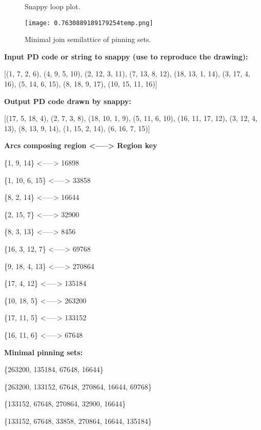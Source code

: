 \documentclass{article}%
\begin{document}
\begin{multicols}{2}
\begin{figure}[H]
\centering

\caption{Snappy loop plot.}
\label{fig:0.8232801002961481temp.svg}
\end{figure}\columnbreak

\begin{figure}[H]
\centering
\texttt{[image: 0.7630889189179254temp.png]}
\caption{Minimal join semilattice of pinning sets.}
\label{fig:0.7630889189179254temp.png}
\end{figure}\end{multicols}\newpage\begin{multicols}{2}
\textbf{Input PD code or string to snappy (use to reproduce the drawing):}

	[(1, 7, 2, 6), (4, 9, 5, 10), (2, 12, 3, 11), (7, 13, 8, 12), (18, 13, 1, 14), (3, 17, 4, 16), (5, 14, 6, 15), (8, 18, 9, 17), (10, 15, 11, 16)]

\textbf{Output PD code drawn by snappy:}

	[(17, 5, 18, 4), (2, 7, 3, 8), (18, 10, 1, 9), (5, 11, 6, 10), (16, 11, 17, 12), (3, 12, 4, 13), (8, 13, 9, 14), (1, 15, 2, 14), (6, 16, 7, 15)]


\textbf{Arcs composing region <-----> Region key}

\{{1, 9, 14}\} <-----> 16898

\{{1, 10, 6, 15}\} <-----> 33858

\{{8, 2, 14}\} <-----> 16644

\{{2, 15, 7}\} <-----> 32900

\{{8, 3, 13}\} <-----> 8456

\{{16, 3, 12, 7}\} <-----> 69768

\{{9, 18, 4, 13}\} <-----> 270864

\{{17, 4, 12}\} <-----> 135184

\{{10, 18, 5}\} <-----> 263200

\{{17, 11, 5}\} <-----> 133152

\{{16, 11, 6}\} <-----> 67648


\columnbreak

\textbf{Minimal pinning sets:}

\{{263200, 135184, 67648, 16644}\}

\{{263200, 133152, 67648, 270864, 16644, 69768}\}

\{{133152, 67648, 270864, 32900, 16644}\}

\{{133152, 67648, 33858, 270864, 16644, 135184}\}


\end{multicols}
\end{document}
